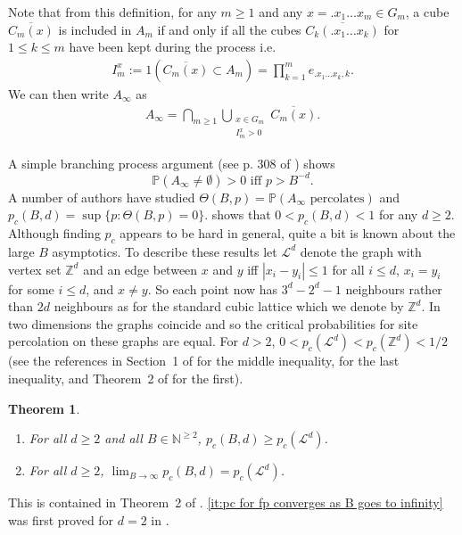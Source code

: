 \documentclass[12pt]{article}
\newtheorem{theorem}{Theorem}
\numberwithin{theorem}{section}
\theoremstyle{def}
\numberwithin{equation}{section}
\renewcommand{\P}{\mathbb{P}}
\newcommand{\Z}{\mathbb{Z}}
\newcommand{\N}{\mathbb{N}}
\newcommand{\cL}{\mathcal{L}}
\begin{document}
Note that from this definition, for any $m\geq 1$ and any $x=.x_1\dots x_m\in G_m$, a cube $\overline{C_m(x)}$ is included in $A_m$ if and only if all the cubes $\overline{C_k(.x_1\dots x_k)}$ for $1\leq k\leq m$ have been kept during the process i.e.\ 
\begin{align}\label{Iande}
	I_m^x:=1(\overline{C_m(x)}\subset A_m) = \prod_{k=1}^{m} e_{.x_1\dots x_k, k}.
\end{align}
We can then write $A_\infty$ as 
\begin{align}\label{eq:Ainfty as intersection}
	A_\infty = \bigcap_{m\geq 1} \bigcup_{\substack{x \in G_m\\ I_m^x>0}} \overline{C_m(x)}. 
\end{align}


A simple branching process argument (see p. 308 of \cite{CCD88}) shows 
\begin{equation*}
	\P(A_\infty\neq\emptyset)>0\text{ iff }p>B^{-d}.
\end{equation*}
A number of authors have studied $\Theta(B,p)=\P(A_\infty\text{ percolates})$ and $p_c(B,d)=\sup\{p:\Theta(B,p)=0\}$.  \cite{CCD88} shows that $0<p_c(B,d)<1$ for any $d\ge 2$. Although finding $p_c$ appears to be hard in general, quite a bit is known about the large $B$ asymptotics. To describe these results let $\cL^d$ denote the graph with vertex set $\Z^d$ and an edge between $x$ and $y$ iff $|x_i-y_i|\le 1$ for all $i\le d$, $x_i=y_i$ for some $i\le d$, and $x\neq y$.  So each point now has $3^d-2^d-1$ neighbours rather than $2d$ neighbours as for the standard cubic lattice which we denote by $\Z^d$.  In two dimensions the graphs coincide and so the critical probabilities for site percolation on these graphs are equal. 
For $d>2$, $0<p_c(\cL^d)<p_c(\Z^d)<1/2$ (see the references in Section~1 of \cite{FG92} for the middle inequality, \cite{CP85} for the last inequality, and Theorem~2 of \cite{GS} for the first).%


\begin{theorem}\label{thm:limit pc for fp} %
	\begin{enumerate}[label=\emph{(\alph*)}, ref=(\alph*), leftmargin=*]	
	\item \label{it:pc for fp is larger than pc} For all $d\ge 2$ and all $B\in\N^{\ge 2}$, $p_c(B,d)\ge p_c(\cL^d)$.
	\item\label{it:pc for fp converges as B goes to infinity} For all $d\ge 2$, $\lim_{B\to\infty} p_c(B,d)=p_c(\cL^d)$.
\end{enumerate}
\end{theorem}
\noindent This is contained in Theorem~2 of \cite{FG92}.  \ref{it:pc for fp converges as B goes to infinity} was first proved for $d=2$ in \cite{CC89}.
\end{document}

